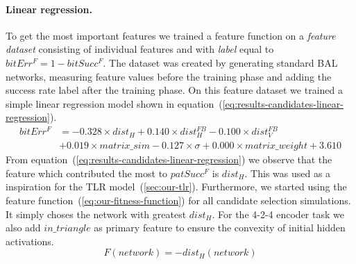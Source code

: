 \paragraph{Linear regression.}
To get the most important features we trained a feature function on a \emph{feature dataset} consisting of individual features and with \emph{label} equal to $bitErr^F = 1-bitSucc^F$. The dataset was created by generating standard BAL networks, measuring feature values before the training phase and adding the success rate label after the training phase. On this feature dataset we trained a simple linear regression model shown in equation~(\ref{eq:results-candidates-linear-regression}).
\begin{align} 
\label{eq:results-candidates-linear-regression} 
bitErr^F &= 
- 0.328 \times dist_{H}
+ 0.140 \times dist_{H}^{FB}
- 0.100 \times dist_{V}^{FB} \nonumber \\
&+ 0.019 \times matrix\_sim
- 0.127 \times \sigma
+ 0.000 \times matrix\_weight
+ 3.610
\end{align}  
From equation~(\ref{eq:results-candidates-linear-regression}) we observe that the feature which contributed the most to $patSucc^F$ is $dist_{H}$. This was used as a inspiration for the TLR model~(\ref{sec:our-tlr}). Furthermore, we started using the feature function~(\ref{eq:our-fitness-function}) for all candidate selection simulations. It simply choses the network with greatest $dist_{H}$. For the 4-2-4 encoder task we also add $in\_triangle$ as primary feature to ensure the convexity of initial hidden activations. 
\begin{equation} 
\label{eq:our-fitness-function} 
  F(network) = -dist_{H}(network)
\end{equation} 





